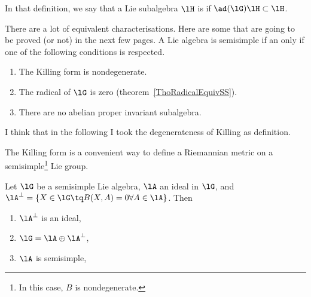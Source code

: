 In that definition, we say that a Lie subalgebra \( \lH\) is  if \( \ad(\lG)\lH\subset\lH\).

There are a lot of equivalent characterisations. Here are some that are going to be proved (or not) in the next few pages. A Lie algebra is semisimple if an only if one of the following conditions is respected.
\begin{enumerate}
	\item
	      The Killing form is nondegenerate.
	\item
	      The radical of \( \lG\) is zero (theorem~\ref{ThoRadicalEquivSS}).
	\item
	      There are no abelian proper invariant subalgebra.
\end{enumerate}

\begin{probleme}
	I think that in the following I took the degenerateness of Killing as definition.
\end{probleme}

The Killing form is a convenient way to define a Riemannian metric on a semisimple\footnote{In this case, $B$ is nondegenerate.} Lie group.

\begin{proposition}
	Let $\lG$ be a semisimple Lie algebra, $\lA$ an ideal in $\lG$, and $\lA^{\perp}=\{X\in\lG\tq B(X,A)=0\forall A\in\lA\}$.
	Then
	\begin{enumerate}
		\item $\lA^{\perp}$ is an ideal,
		\item $\lG=\lA\oplus\lA^{\perp}$,
		\item $\lA$ is semisimple,
	\end{enumerate}
	\label{prop:a_aperp}
\end{proposition}

